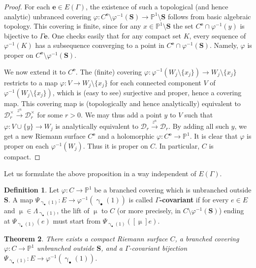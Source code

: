 \documentclass[11pt,b5paper,notitlepage]{article}
\theoremstyle{definition}
\newtheorem{df}{Definition}[subsection]
\theoremstyle{plain}
\newtheorem{thm}[df]{Theorem}
\newcommand{\mc}{\mathcal}
\newcommand{\mbf}{\mathbf}
\newcommand{\blt}{\bullet}
\newcommand{\Pbb}{\mathbb P}
\newcommand{\Sbf}{\mathbf{S}}
\numberwithin{equation}{subsection}
\begin{document}
\begin{proof}
For each $\mbf e\in E(\Gamma)$, the existence of such a topological (and hence analytic) unbranced covering $\varphi:C^{\mbf e}\setminus\varphi^{-1}(\Sbf)\rightarrow\Pbb^1\setminus\Sbf$ follows from basic algebraic topology. This covering is finite, since for any $x\in\Pbb^1\setminus\Sbf$ the set $C^{\mbf e}\cap\varphi^{-1}(y)$ is bijective to $\Gamma \mbf e$. One checks easily that for any compact set $K$, every sequence of $\varphi^{-1}(K)$ has a subsequence converging to a point in $C^{\mbf e}\cap\varphi^{-1}(\Sbf)$. Namely, $\varphi$ is proper on $C^{\mbf e}\setminus\varphi^{-1}(\Sbf)$.

We now extend it to $C^{\mbf e}$. The (finite) covering $\varphi:\varphi^{-1}(W_j\setminus\{x_j\})\rightarrow W_j\setminus\{x_j\}$ restricts to a map $\varphi:V \rightarrow W_j\setminus\{x_j\}$ for each connected component $V$ of $\varphi^{-1}(W_j\setminus\{x_j\})$, which is (easy to see) surjective and proper, hence a covering map. This covering map is (topologically and hence analytically) equivalent to $\mc D_r^\times\xrightarrow{z^n}\mc D_r^\times$ for some $r>0$. We may thus add a point $y$ to $V$ such that $\varphi:V\cup\{y\}\rightarrow W_j$ is analytically equivalent to $\mc D_r\xrightarrow{z^n}\mc D_r$. By adding all such $y$, we get a new Riemann  surface $C^{\mbf e}$ and a holomorphic $\varphi:C^{\mbf e}\rightarrow\Pbb^1$. It is clear that $\varphi$ is proper on each $\varphi^{-1}(W_j)$. Thus it is proper on $C$. In particular, $C$ is compact.
\end{proof}


Let us formulate the above proposition in a way independent of $E(\Gamma)$.

\begin{df}\label{lb66}
Let $\varphi:C\rightarrow\Pbb^1$ be a branched covering which is unbranched outside $\Sbf$. A map $\Psi_{\upgamma_\blt(1)}:E\rightarrow\varphi^{-1}(\upgamma_\blt(1))$ is called \textbf{$\Gamma$-covariant}  if for every $e\in E$ and $\upmu\in\Lambda_{\upgamma_\blt(1)}$, the lift of $\upmu$ to $C$ (or more precisely, in $C\setminus\varphi^{-1}(\Sbf)$) ending at $\Psi_{\upgamma_\blt(1)}(e)$ must start from $\Psi_{\upgamma_\blt(1)}([\upmu]e)$.
\end{df}



\begin{thm}\label{lb38}
There exists a compact Riemann surface $C$, a branched covering $\varphi:C\rightarrow\Pbb^1$ unbranched outside $\Sbf$, and a $\Gamma$-covariant bijection $\Psi_{\upgamma_\blt(1)}:E\rightarrow \varphi^{-1}(\upgamma_\blt(1))$.
\end{thm}
\end{document}
